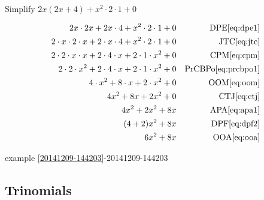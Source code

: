 \begin{example}[id:20141209-145211] \label{20141209-145211} \hfill \\

Simplify $2x(2x+4)+x^2 \cdot 2 \cdot 1 + 0$

\soln

\solnsteps
\begin{align*}
2x \cdot 2x + 2x \cdot 4 + x^2 \cdot 2 \cdot 1 + 0 && \text{DPE} \eqref{eq:dpe1} \\
2 \cdot x \cdot 2 \cdot x + 2 \cdot x \cdot 4 + x^2 \cdot 2 \cdot 1 + 0 && \text{JTC} \eqref{eq:jtc} \\
2 \cdot 2 \cdot x \cdot x + 2 \cdot 4 \cdot x + 2 \cdot 1 \cdot x^2 + 0 && \text{CPM} \eqref{eq:cpm} \\
2 \cdot 2 \cdot x^2 + 2 \cdot 4 \cdot x + 2 \cdot 1 \cdot x^2 + 0 && \text{PrCBPo} \eqref{eq:prcbpo1} \\
4 \cdot x^2 + 8 \cdot x + 2 \cdot x^2 + 0 && \text{OOM} \eqref{eq:oom} \\
4 x^2 +8x + 2x^2 + 0 && \text{CTJ} \eqref{eq:ctj} \\
4x^2 + 2x^2 + 8x && \text{APA} \eqref{eq:apa1} \\
(4+2)x^2 +8x && \text{DPF} \eqref{eq:dpf2} \\
6x^2+8x && \text{OOA} \eqref{eq:ooa}
\end{align*}

\qdepend 

\qdependlist
example \ref{20141209-144203}-20141209-144203
\end{example}

\subsection*{Trinomials}

